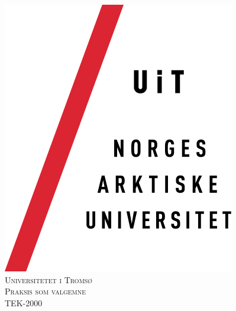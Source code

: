 \documentclass[12pt, a4paper]{article}
\begin{document}


\begin{titlepage}

\newcommand{\HRule}{\rule{\linewidth}{0.5mm}} %

\center %
 

\vspace*{-3.5cm}\hspace*{-16cm}\includegraphics{uitlogo.png}\\[3.0cm] %
\vspace*{-1.0cm}\textsc{\LARGE Universitetet i Tromsø}\\[2.5cm] %
\textsc{\Large Praksis som valgemne}\\[0.5cm] %
\textsc{\large TEK-2000}\\[0.5cm] %


\end{titlepage}
\end{document}
